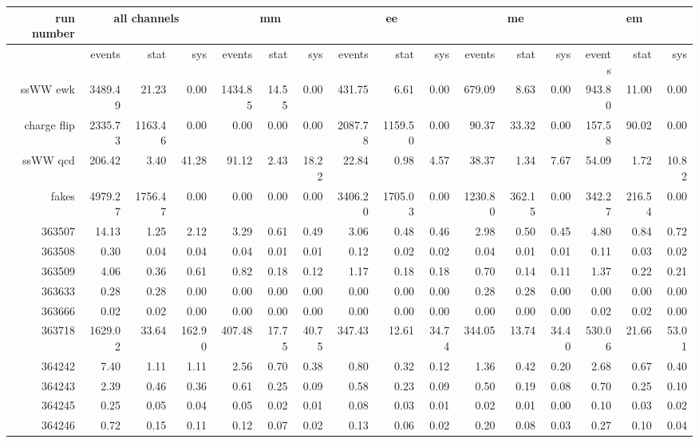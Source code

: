 \begin{sidewaystable}[!htbp]
  {\scriptsize
    \begin{tabular}{r|rrr|rrr|rrr|rrr|rrr}
      run number&\multicolumn{3}{c|}{all channels}&\multicolumn{3}{c|}{mm}&\multicolumn{3}{c|}{ee}&\multicolumn{3}{c|}{me}&\multicolumn{3}{c}{em}\\
      \hline
      &events&stat&sys&events&stat&sys&events&stat&sys&events&stat&sys&events&stat&sys\\
      \hline\hline
      ssWW ewk&3489.49&21.23&0.00&1434.85&14.55&0.00&431.75&6.61&0.00&679.09&8.63&0.00&943.80&11.00&0.00\\
      charge flip&2335.73&1163.46&0.00&0.00&0.00&0.00&2087.78&1159.50&0.00&90.37&33.32&0.00&157.58&90.02&0.00\\
      ssWW qcd&206.42&3.40&41.28&91.12&2.43&18.22&22.84&0.98&4.57&38.37&1.34&7.67&54.09&1.72&10.82\\
      fakes&4979.27&1756.47&0.00&0.00&0.00&0.00&3406.20&1705.03&0.00&1230.80&362.15&0.00&342.27&216.54&0.00\\
      363507&14.13&1.25&2.12&3.29&0.61&0.49&3.06&0.48&0.46&2.98&0.50&0.45&4.80&0.84&0.72\\
      363508&0.30&0.04&0.04&0.04&0.01&0.01&0.12&0.02&0.02&0.04&0.01&0.01&0.11&0.03&0.02\\
      363509&4.06&0.36&0.61&0.82&0.18&0.12&1.17&0.18&0.18&0.70&0.14&0.11&1.37&0.22&0.21\\
      363633&0.28&0.28&0.00&0.00&0.00&0.00&0.00&0.00&0.00&0.28&0.28&0.00&0.00&0.00&0.00\\
      
      363666&0.02&0.02&0.00&0.00&0.00&0.00&0.00&0.00&0.00&0.00&0.00&0.00&0.02&0.02&0.00\\
      
      363718&1629.02&33.64&162.90&407.48&17.75&40.75&347.43&12.61&34.74&344.05&13.74&34.40&530.06&21.66&53.01\\
      
      364242&7.40&1.11&1.11&2.56&0.70&0.38&0.80&0.32&0.12&1.36&0.42&0.20&2.68&0.67&0.40\\
      
      364243&2.39&0.46&0.36&0.61&0.25&0.09&0.58&0.23&0.09&0.50&0.19&0.08&0.70&0.25&0.10\\
      
      364245&0.25&0.05&0.04&0.05&0.02&0.01&0.08&0.03&0.01&0.02&0.01&0.00&0.10&0.03&0.02\\
      
      364246&0.72&0.15&0.11&0.12&0.07&0.02&0.13&0.06&0.02&0.20&0.08&0.03&0.27&0.10&0.04\\
      

\end{tabular}}
\end{sidewaystable}
